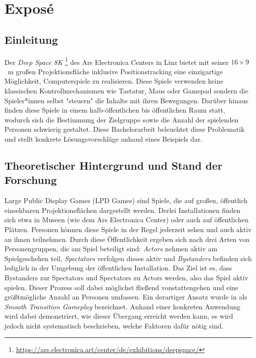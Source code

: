 \chapter{Exposé}

\section{Einleitung}

Der \emph{Deep Space 8K}%
\footnote{\url{https://ars.electronica.art/center/de/exhibitions/deepspace/}}
des Ars Electronica Centers in Linz bietet mit seiner $16 \times 9$~m
großen Projektionsfläche inklusive Positionstracking eine einzigartige
Möglichkeit, Computerspiele zu realisieren. Diese Spiele verwenden keine
klassischen Kontrollmechanismen wie Tastatur, Maus oder Gamepad sondern die
Spieler*innen selbst "steuern" die Inhalte mit ihren Bewegungen. Darüber
hinaus finden diese Spiele in einem halb-öffentlichen bis öffentlichen Raum
statt, wodurch sich die Bestimmung der Zielgruppe sowie die Anzahl der
spielenden Personen schwierig gestaltet. Diese Bachelorarbeit beleuchtet
diese Problematik und stellt konkrete Lösungsvorschläge anhand eines
Beispiels dar.


\section{Theoretischer Hintergrund und Stand der Forschung}
\label{sec:hintergrund}

Large Public Display Games (LPD Games) sind Spiele, die auf großen,
öffentlich einsehbaren Projektionsflächen dargestellt werden. Derlei
Installationen finden sich etwa in Museen (wie dem Ars Electronica Center)
oder auch auf öffentlichen Plätzen. Personen können diese Spiele in der Regel
jederzeit sehen und auch aktiv an ihnen teilnehmen. Durch diese
Öffentlichkeit ergeben sich nach \cite{Finke2008} drei Arten von
Personengruppen, die am Spiel beteiligt sind: \emph{Actors} nehmen aktiv am
Spielgeschehen teil, \emph{Spectators} verfolgen dieses aktiv und
\emph{Bystanders} befinden sich lediglich in der Umgebung der öffentlichen
Installation. Das Ziel ist es, dass Bystanders zur Spectators und Spectators
zu Actors werden, also das Spiel aktiv spielen. Dieser Prozess soll dabei
möglichst fließend vonstattengehen und eine größtmögliche Anzahl an Personen
umfassen. Ein derartiger Ansatz wurde in \cite{Hochleitner2013} als
\emph{Smooth Transition Gameplay} bezeichnet. Anhand einer konkreten
Anwendung wird dabei demonstriert, wie dieser Übergang erreicht werden kann,
es wird jedoch nicht systematisch beschrieben, welche Faktoren dafür nötig sind.

